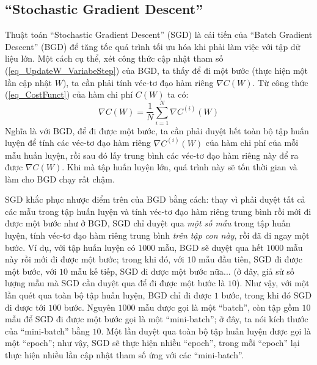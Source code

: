 \subsection{``Stochastic Gradient Descent''}
Thuật toán ``Stochastic Gradient Descent'' (SGD) là cải tiến của ``Batch Gradient Descent'' (BGD) để tăng tốc quá trình tối ưu hóa khi phải làm việc với tập dữ liệu lớn. Một cách cụ thể, xét công thức cập nhật tham số (\ref{eq_UpdateW_VariabeStep}) của BGD, ta thấy để đi một bước (thực hiện một lần cập nhật $W$), ta cần phải tính véc-tơ đạo hàm riêng $\nabla C(W)$. Từ công thức (\ref{eq_CostFunct}) của hàm chi phí $C(W)$ ta có:
\begin{equation}
	\nabla C(W) = \frac{1}{N} \sum_{i=1}^N \nabla C^{(i)}(W)
\end{equation}
Nghĩa là với BGD, để đi được một bước, ta cần phải duyệt hết toàn bộ tập huấn luyện để tính các véc-tơ đạo hàm riêng $\nabla C^{(i)}(W)$ của hàm chi phí của mỗi mẫu huấn luyện, rồi sau đó lấy trung bình các véc-tơ đạo hàm riêng này để ra được $\nabla C(W)$. Khi mà tập huấn luyện lớn, quá trình này sẽ tốn thời gian và làm cho BGD chạy rất chậm.

SGD khắc phục nhược điểm trên của BGD bằng cách: thay vì phải duyệt tất cả các mẫu trong tập huấn luyện và tính véc-tơ đạo hàm riêng trung bình rồi mới đi được một bước như ở BGD, SGD chỉ duyệt qua \emph{một số mẫu} trong tập huấn luyện, tính véc-tơ đạo hàm riêng trung bình \emph{trên tập con này}, rồi đã đi ngay một bước. Ví dụ, với tập huấn luyện có $1000$ mẫu, BGD sẽ duyệt qua hết $1000$ mẫu này rồi mới đi được một bước; trong khi đó, với $10$ mẫu đầu tiên, SGD đi được một bước, với $10$ mẫu kế tiếp, SGD đi được một bước nữa... (ở đây, giả sử số lượng mẫu mà SGD cần duyệt qua để đi được một bước là $10$). Như vậy, với một lần quét qua toàn bộ tập huấn luyện, BGD chỉ đi được $1$ bước, trong khi đó SGD đi được tới $100$ bước. Nguyên $1000$ mẫu được gọi là một ``batch'', còn tập gồm $10$ mẫu để SGD đi được một bước gọi là một ``mini-batch''; ở đây, ta nói kích thước của ``mini-batch'' bằng $10$. Một lần duyệt qua toàn bộ tập huấn luyện được gọi là một ``epoch''; như vậy, SGD sẽ thực hiện nhiều ``epoch'', trong mỗi ``epoch'' lại thực hiện nhiều lần cập nhật tham số ứng với các ``mini-batch''.

